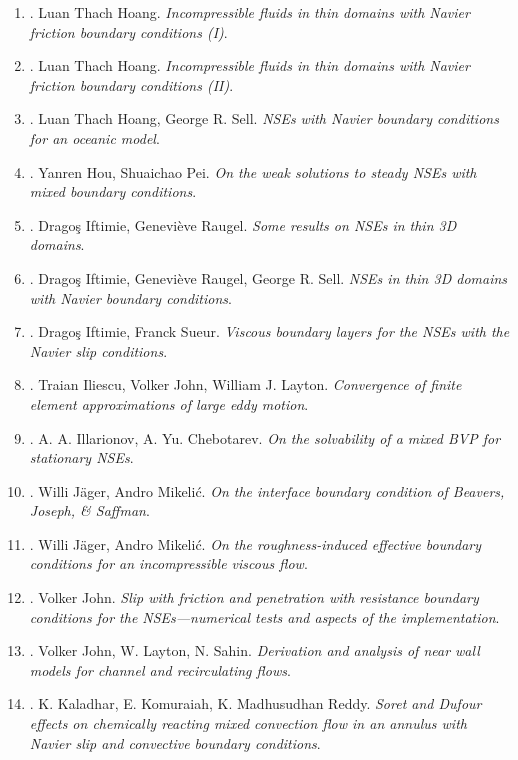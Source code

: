 \documentclass{article}
\begin{document}
\begin{enumerate}
	\item \cite{Hoang2010}. {\sc Luan Thach Hoang}. {\it Incompressible fluids in thin domains with Navier friction boundary conditions (I)}.
	\item \cite{Hoang2013}. {\sc Luan Thach Hoang}. {\it Incompressible fluids in thin domains with Navier friction boundary conditions (II)}.
	\item \cite{Hoang_Sell2010}. {\sc Luan Thach Hoang, George R. Sell}. {\it NSEs with Navier boundary conditions for an oceanic model}.
	\item \cite{Hou_Pei2019}. {\sc Yanren Hou, Shuaichao Pei}. {\it On the weak solutions to steady NSEs with mixed boundary conditions}.
	\item \cite{Iftimie_Raugel2001}. {\sc Drago\c{s} Iftimie, Genevi\`eve Raugel}. {\it Some results on NSEs in thin 3D domains}.
	\item \cite{Iftimie_Raugel_Sell2007}. {\sc Drago\c{s} Iftimie, Genevi\`eve Raugel, George R. Sell}. {\it NSEs in thin 3D domains with Navier boundary conditions}.
	\item \cite{Iftimie_Sueur2011}. {\sc Drago\c{s} Iftimie, Franck Sueur}. {\it Viscous boundary layers for the NSEs with the Navier slip conditions}.
	\item \cite{Iliescu_John_Layton2002}. {\sc Traian Iliescu, Volker John, William J. Layton}. {\it Convergence of finite element approximations of large eddy motion}.
	\item \cite{Illarionov_Chebotarev2001}. {\sc A. A. Illarionov, A. Yu. Chebotarev}. {\it On the solvability of a mixed BVP for stationary NSEs}.
	\item \cite{Jager_Mikelic2000}. {\sc Willi J\"{a}ger, Andro Mikeli\'{c}}. {\it On the interface boundary condition of Beavers, Joseph, \& Saffman}.
	\item \cite{Jager_Mikelic2001}. {\sc Willi J\"{a}ger, Andro Mikeli\'{c}}. {\it On the roughness-induced effective boundary conditions for an incompressible viscous flow}.
	\item \cite{John2002}. {\sc Volker John}. {\it Slip with friction and penetration with resistance boundary conditions for the NSEs---numerical tests and aspects of the implementation}.
	\item \cite{John_Layton_Sahin2004}. {\sc Volker John, W. Layton, N. Sahin}. {\it Derivation and analysis of near wall models for channel and recirculating flows}.
	\item \cite{Kaladhar_Komuraiah_Madhusudhan-Reddy2019}. {\sc K. Kaladhar, E. Komuraiah, K. Madhusudhan Reddy}. {\it Soret and Dufour effects on chemically reacting mixed convection flow in an annulus with {N}avier slip and convective boundary conditions}.

\end{enumerate}
\end{document}
